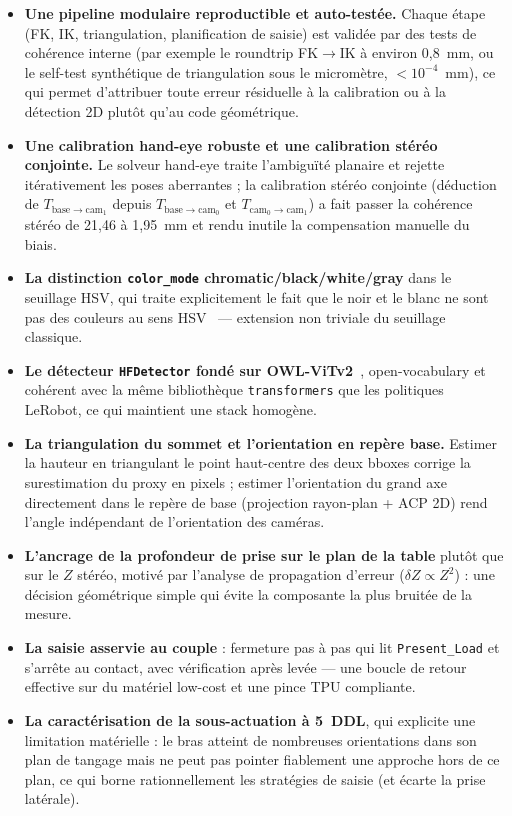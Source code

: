 \begin{itemize}
  \item \textbf{Une pipeline modulaire reproductible et auto-testée.} Chaque
        étape (FK, IK, triangulation, planification de saisie) est validée par
        des tests de cohérence interne (par exemple le roundtrip FK$\rightarrow$IK
        à environ 0,8~mm, ou le self-test synthétique de triangulation sous le
        micromètre, $<10^{-4}$~mm), ce qui permet d'attribuer toute erreur résiduelle à la
        calibration ou à la détection 2D plutôt qu'au code géométrique.
  \item \textbf{Une calibration hand-eye robuste et une calibration stéréo
        conjointe.} Le solveur hand-eye traite l'ambiguïté planaire et rejette
        itérativement les poses aberrantes ; la calibration stéréo conjointe
        (déduction de $T_{\text{base}\rightarrow\text{cam}_1}$ depuis
        $T_{\text{base}\rightarrow\text{cam}_0}$ et $T_{\text{cam}_0\rightarrow
        \text{cam}_1}$) a fait passer la cohérence stéréo de 21{,}46 à 1{,}95~mm
        et rendu inutile la compensation manuelle du biais.
  \item \textbf{La distinction \texttt{color\_mode}
        chromatic/black/white/gray} dans le seuillage HSV, qui traite
        explicitement le fait que le noir et le blanc ne sont pas des
        couleurs au sens HSV~\cite{forsyth_computer_2012} --- extension non
        triviale du seuillage classique.
  \item \textbf{Le détecteur \texttt{HFDetector} fondé sur
        OWL-ViTv2}~\cite{minderer_owlv2_2023}, open-vocabulary et cohérent avec
        la même bibliothèque \texttt{transformers} que les politiques LeRobot,
        ce qui maintient une stack homogène.
  \item \textbf{La triangulation du sommet et l'orientation en repère base.}
        Estimer la hauteur en triangulant le point haut-centre des deux bboxes
        corrige la surestimation du proxy en pixels ; estimer l'orientation du
        grand axe directement dans le repère de base (projection rayon-plan +
        ACP 2D) rend l'angle indépendant de l'orientation des caméras.
  \item \textbf{L'ancrage de la profondeur de prise sur le plan de la table}
        plutôt que sur le $Z$ stéréo, motivé par l'analyse de propagation
        d'erreur ($\delta Z \propto Z^2$) : une décision géométrique simple qui
        évite la composante la plus bruitée de la mesure.
  \item \textbf{La saisie asservie au couple} : fermeture pas à pas qui lit
        \texttt{Present\_Load} et s'arrête au contact, avec vérification après
        levée --- une boucle de retour effective sur du matériel low-cost et une
        pince TPU compliante.
  \item \textbf{La caractérisation de la sous-actuation à 5~DDL}, qui explicite
        une limitation matérielle : le bras atteint de nombreuses orientations
        dans son plan de tangage mais ne peut pas pointer fiablement une approche
        hors de ce plan, ce qui borne rationnellement les stratégies de saisie
        (et écarte la prise latérale).
\end{itemize}


